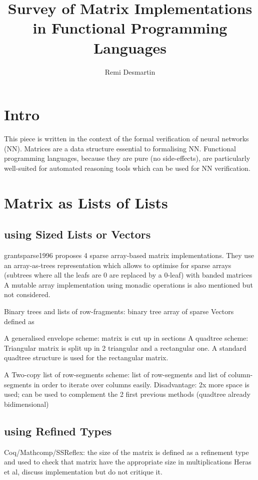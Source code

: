 \documentclass[]{article}
\title{Survey of Matrix Implementations in Functional Programming Languages}
\author{Remi Desmartin}
\begin{document}
\maketitle

\begin{abstract}

\end{abstract}

\section{Intro}
This piece is written in the context of the formal verification of neural networks (NN). Matrices are a data structure essential to formalising NN. Functional programming languages, because they are pure (no side-effects), are particularly well-suited for automated reasoning tools which can be used for NN verification.

\section{Matrix as Lists of Lists}
\subsection{using Sized Lists or Vectors}

grantsparse1996 proposes 4 sparse array-based matrix implementations. They use an array-as-trees representation which allows to optimise for sparse arrays (subtrees where all the leafs are 0 are replaced by a 0-leaf) with banded matrices A mutable array implementation using monadic operations is also mentioned but not considered.

Binary trees and lists of row-fragments: binary tree array of sparse Vectors defined as \lstlisting{[(Int, [Double])]}

A generalised envelope scheme: matrix is cut up in sections
A quadtree scheme: Triangular matrix is split up in 2 triangular and a rectangular one. 
A standard quadtree structure is used for the rectangular matrix.

A Two-copy list of row-segments scheme: list of row-segments and list of column-segments in order to iterate over columns easily. Disadvantage: 2x more space is used; can be used to complement the 2 first previous methods (quadtree already bidimensional)



\subsection{using Refined Types}
%
Coq/Mathcomp/SSReflex: the size of the matrix is defined as a refinement type and used to check that matrix have the appropriate size in multiplications
Heras et al, discuss implementation but do not critique it.
\end{document}
